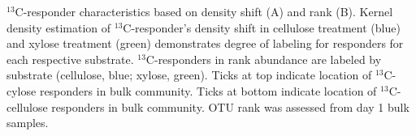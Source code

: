 $^{13}$C-responder characteristics based on density shift (A) and rank (B).
Kernel density estimation of $^{13}$C-responder's density shift in cellulose
treatment (blue) and xylose treatment (green) demonstrates degree of labeling
for responders for each respective substrate. $^{13}$C-responders in rank
abundance are labeled by substrate (cellulose, blue; xylose, green). Ticks at top indicate
location of $^{13}$C-cylose responders in bulk community. Ticks at bottom indicate location of
$^{13}$C-cellulose responders in bulk community. OTU rank was assessed from day 1 bulk samples.